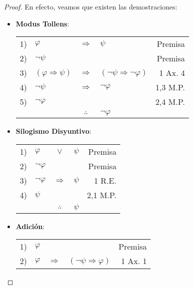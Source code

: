 \documentclass[12pt]{report}
\newcounter{it}
\theoremstyle{largebreak}
\begin{document}
    \begin{proof}
        En efecto, veamos que existen las demostraciones:
        \begin{itemize}
            \item \textbf{Modus Tollens}:
            \begin{center}
                \begin{tabular}{l l c l r}
                    1) & $\varphi$ & $\Rightarrow$ & $\psi$ & Premisa \\
                    2) & $\neg\psi$ &  &  & Premisa \\
                    3) & $(\varphi\Rightarrow\psi)$ & $\Rightarrow$ & $(\neg\psi\Rightarrow\neg\varphi)$ & 1 Ax. 4 \\
                    4) & $\neg\psi$ & $\Rightarrow$ & $\neg\varphi$ & 1,3 M.P. \\
                    5) & $\neg\varphi$ &  &  & 2,4 M.P. \\
                    \hline
                    & & $\therefore$ & $\neg\varphi$ & \\
                \end{tabular}
            \end{center}
            \item \textbf{Silogismo Disyuntivo}:
            \begin{center}
                \begin{tabular}{l l c l r}
                    1) & $\varphi$ & $\lor$ & $\psi$ & Premisa \\
                    2) & $\neg\varphi$ &  &  & Premisa \\
                    3) & $\neg\varphi$ & $\Rightarrow$ & $\psi$ & 1 R.E.\\
                    4) & $\psi$ &  &  & 2,1 M.P. \\
                    \hline
                    & & $\therefore$ & $\psi$ & \\
                \end{tabular}
            \end{center}
            \item \textbf{Adición}:
            \begin{center}
                \begin{tabular}{l l c l r}
                    1) & $\varphi$ &  &  & Premisa \\
                    2) & $\varphi$ & $\Rightarrow$ & $(\neg\psi\Rightarrow\varphi)$ & 1 Ax. 1 \\

\end{tabular}
\end{center}
\end{itemize}
\end{proof}
\end{document}
